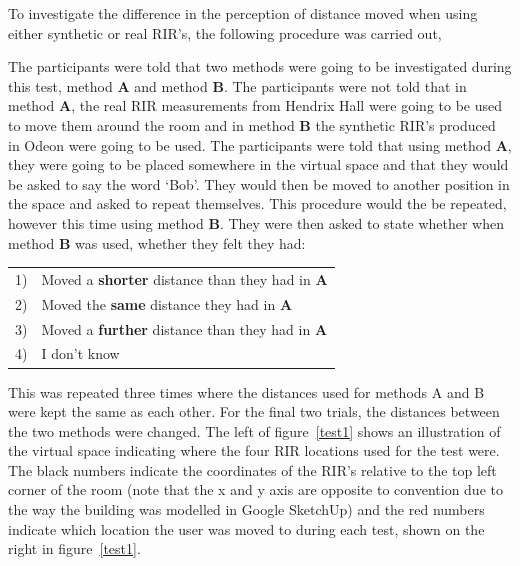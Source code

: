 \documentclass[../../main.tex]{subfiles}
\begin{document}
			To investigate the difference in the perception of distance moved when using either synthetic or real \ac{RIR}'s, the following procedure was carried out,


			The participants were told that two methods were going to be investigated during this test, method \textbf{A} and method \textbf{B}. The participants were not told that in method \textbf{A}, the real \ac{RIR} measurements from Hendrix Hall were going to be used to move them around the room and in method \textbf{B} the synthetic \ac{RIR}'s produced in Odeon were going to be used. The participants were told that using method \textbf{A}, they were going to be placed somewhere in the virtual space and that they would be asked to say the word `Bob'. They would then be moved to another position in the space and asked to repeat themselves. This procedure would the be repeated, however this time using method \textbf{B}. They were then asked to state whether when method \textbf{B} was used, whether they felt they had:

			\vspace{5mm}
			\begin{center}
			    \begin{tabular}{l l}
			       1) & Moved a \textbf{shorter} distance than they had in \textbf{A}\\
			       2) & Moved the \textbf{same} distance they had in \textbf{A}\\
			       3) & Moved a \textbf{further} distance than they had in \textbf{A}\\
			       4) & I don't know\\
			    \end{tabular}
			\end{center}
			\vspace{5mm}

			This was repeated three times where the distances used for methods A and B were kept the same as each other. For the final two trials, the distances between the two methods were changed. The left of figure~\ref{test1} shows an illustration of the virtual space indicating where the four \ac{RIR} locations used for the test were. The black numbers indicate the coordinates of the \ac{RIR}'s  relative to the top left corner of the room (note that the x and y axis are opposite to convention due to the way the building was modelled in Google SketchUp) and the red numbers indicate which location the user was moved to during each test, shown on the right in figure~\ref{test1}.
\end{document}

